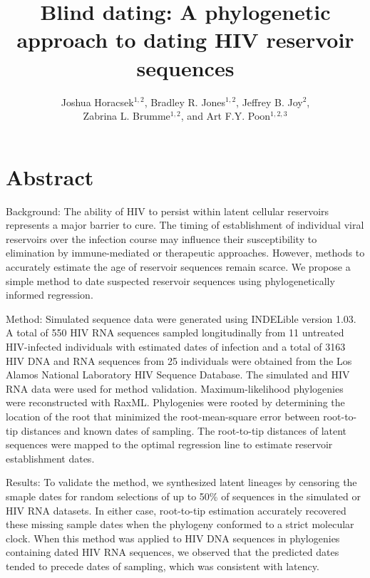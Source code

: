 \documentclass[12pt]{article}
\begin{document}
\title{Blind dating: A phylogenetic approach to dating HIV reservoir sequences}

\author{Joshua Horacsek$^{1,2}$, Bradley R. Jones$^{1,2}$, Jeffrey B. Joy$^2$, \\ Zabrina L. Brumme$^{1,2}$, and Art F.Y. Poon$^{1,2,3}$}
\baselineskip 22pt
\pagewiselinenumbers

\date{}
\maketitle

\section * {Abstract}

Background: 
The ability of HIV to persist within latent cellular reservoirs represents a major barrier to cure. The timing of establishment of individual viral reservoirs over the infection course may influence their susceptibility to elimination by immune-mediated or therapeutic approaches. However, methods to accurately estimate the age of reservoir sequences remain scarce. We propose a simple method to date suspected reservoir sequences using phylogenetically informed regression.

Method: 
Simulated sequence data were generated using INDELible version 1.03. A total of 550 HIV RNA sequences sampled longitudinally from 11 untreated HIV-infected individuals with estimated dates of infection and a total of 3163 HIV DNA and RNA sequences from 25 individuals were obtained from the Los Alamos National Laboratory HIV Sequence Database. The simulated and HIV RNA data were used for method validation. Maximum-likelihood phylogenies were reconstructed with RaxML. Phylogenies were rooted by determining the location of the root that minimized the root-mean-square error between root-to-tip distances and known dates of sampling. The root-to-tip distances of latent sequences were mapped to the optimal regression line to estimate reservoir establishment dates.

Results: 
To validate the method, we synthesized latent lineages by censoring the smaple dates for random selections of up to 50\% of sequences in the simulated or HIV RNA datasets. In either case, root-to-tip estimation accurately recovered these missing sample dates when the phylogeny conformed to a strict molecular clock. When this method was applied to HIV DNA sequences in phylogenies containing dated HIV RNA sequences, we observed that the predicted dates tended to precede dates of sampling, which was consistent with latency.
\end{document}
